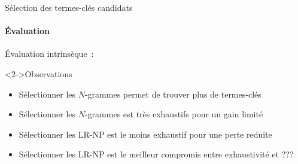  \begin{frame}{Sélection des termes-clés candidats}\framesubtitle{Évaluation}
    Évaluation intrinsèque~:

    \begin{center}
    \end{center}

    \begin{block}<2->{Observations}
      \begin{itemize}
        \item<2->{Sélectionner les $N$-grammes permet de trouver plus de termes-clés}
        \item<3->{Sélectionner les $N$-grammes est très exhaustifs pour un gain limité}
        \item<4->{Sélectionner les LR-NP est le moins exhaustif pour
                  une perte reduite}
        \item<5->{Sélectionner les LR-NP est le meilleur compromis
                  entre exhaustivité et ???}
      \end{itemize}
    \end{block}
  \end{frame}


